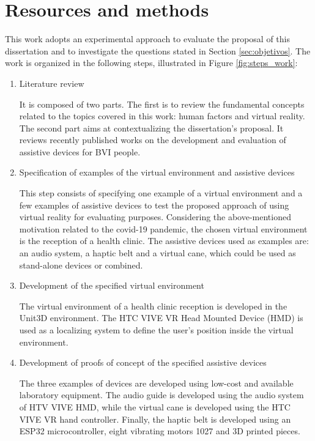 \section{Resources and methods} 

This work adopts an experimental approach to evaluate the proposal of this dissertation and to investigate the questions stated in Section \ref{sec:objetivos}. 
The work is organized in the following steps, illustrated in Figure \ref{fig:steps_work}:

\begin{enumerate}[leftmargin = 6em, label = Step \arabic* -- ]
    \item Literature review 
    
    It is composed of two parts. The first is to review the fundamental concepts related to the topics covered in this work: human factors and virtual reality. The second part aims at contextualizing the dissertation’s proposal. It reviews recently published works on the development and evaluation of assistive devices for BVI people.
    
    \item Specification of examples of the virtual environment and assistive devices

    This step consists of specifying one example of a virtual environment and a few examples of assistive devices to test the proposed approach of using virtual reality for evaluating purposes. Considering the above-mentioned motivation related to the covid-19 pandemic, the chosen virtual environment is the reception of a health clinic. The assistive devices used as examples are: an audio system, a haptic belt and a virtual cane, which could be used as stand-alone devices or combined.
    
    \item Development of the specified virtual environment
    
    The virtual environment of a health clinic reception is developed in the Unit3D environment. The HTC VIVE VR Head Mounted Device (HMD) is used as a localizing system to define the user's position inside the virtual environment.
    
    \item Development of proofs of concept of the specified assistive devices
    
    The three examples of devices are developed using low-cost and available laboratory equipment. The audio guide is developed using the audio system of HTV VIVE HMD, while the virtual cane is developed using the HTC VIVE VR hand controller. Finally, the haptic belt is developed using an ESP32 microcontroller, eight vibrating motors 1027 and 3D printed pieces.
    

\end{enumerate}
